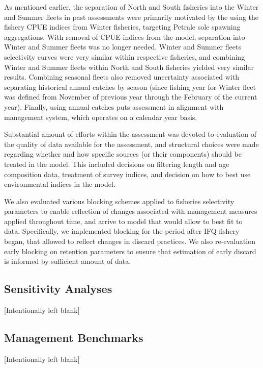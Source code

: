 \documentclass[
]{scrartcl}
\begin{document}
As mentioned earlier, the separation of North and South fisheries into
the Winter and Summer fleets in past assessments were primarily
motivated by the using the fishery CPUE indices from Winter fisheries,
targeting Petrale sole spawning aggregations. With removal of CPUE
indices from the model, separation into Winter and Summer fleets was no
longer needed. Winter and Summer fleets selectivity curves were very
similar within respective fisheries, and combining Winter and Summer
fleets within North and South fisheries yielded very similar results.
Combining seasonal fleets also removed uncertainty associated with
separating historical annual catches by season (since fishing year for
Winter fleet was defined from November of previous year through the
February of the current year). Finally, using annual catches puts
assessment in alignment with management system, which operates on a
calendar year basis.

Substantial amount of efforts within the assessment was devoted to
evaluation of the quality of data available for the assessment, and
structural choices were made regarding whether and how specific sources
(or their components) should be treated in the model. This included
decisions on filtering length and age composition data, treatment of
survey indices, and decision on how to best use environmental indices in
the model.

We also evaluated various blocking schemes applied to fisheries
selectivity parameters to enable reflection of changes associated with
management measures applied throughout time, and arrive to model that
would allow to best fit to data. Specifically, we implemented blocking
for the period after IFQ fishery began, that allowed to reflect changes
in discard practices. We also re-evaluation early blocking on retention
parameters to ensure that estimation of early discard is informed by
sufficient amount of data.

\subsection{Sensitivity Analyses}\label{sec-sensitivity-analyses}

{[}Intentionally left blank{]}

\subsection{Management Benchmarks}\label{sec-management-benchmarks}

{[}Intentionally left blank{]}
\end{document}
